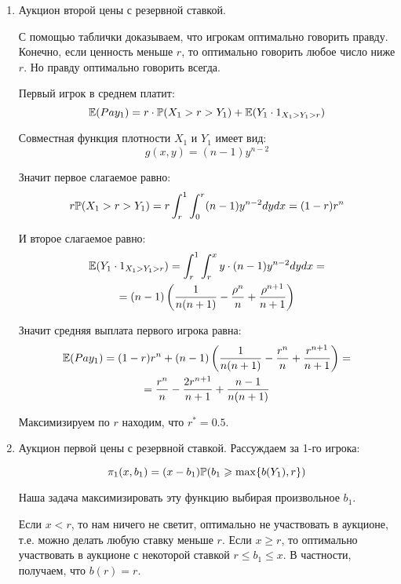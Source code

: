 \begin{enumerate}
\item Аукцион второй цены с резервной ставкой. 

С помощью таблички доказываем, что игрокам оптимально говорить правду. Конечно, если ценность меньше $ r $, то оптимально говорить любое число ниже $ r $. Но правду оптимально говорить всегда. 

Первый игрок в среднем платит:
\begin{equation}
\E(Pay_{1})=r\cdot \P(X_{1}>r>Y_{1})+\E(Y_{1}\cdot 1_{X_{1}>Y_{1}>r})
\end{equation}

Совместная функция плотности $ X_{1} $ и $ Y_{1} $ имеет вид:
\begin{equation}
g(x,y)=(n-1)y^{n-2}
\end{equation}

Значит первое слагаемое равно:
\begin{equation}
r\P(X_{1}>r>Y_{1})=r\int_{r}^{1}\int_{0}^{r} (n-1)y^{n-2} dy dx=(1-r)r^{n}
\end{equation}

И второе слагаемое равно:
\begin{multline} \label{E_Y_1XYr}
\E(Y_{1}\cdot 1_{X_{1}>Y_{1}>r})=\int_{r}^{1}\int_{r}^{x} y\cdot (n-1)y^{n-2} dy dx=\\
=(n-1)\left(\frac{1}{n(n+1)}-\frac{\rho^{n}}{n}+\frac{\rho^{n+1}}{n+1}\right)
\end{multline}

Значит средняя выплата первого игрока равна:
\begin{multline}
\E(Pay_{1})=(1-r)r^{n}+(n-1)\left(\frac{1}{n(n+1)}-\frac{r^{n}}{n}+\frac{r^{n+1}}{n+1}\right)=\\
=\frac{r^{n}}{n}-\frac{2r^{n+1}}{n+1}+\frac{n-1}{n(n+1)}
\end{multline}

Максимизируем по $ r $ находим, что $ r^{*}=0.5 $.


\item Аукцион первой цены с резервной ставкой. Рассуждаем за 1-го игрока: 

\begin{equation}
\pi_{1}(x,b_{1})=(x-b_{1})\P(b_{1}\geq \max\{b(Y_{1}),r\})
\end{equation}

Наша задача максимизировать эту функцию выбирая произвольное $ b_{1} $.

Если $ x<r $, то нам ничего не светит, оптимально не участвовать в аукционе, т.е. можно делать любую ставку меньше $ r $. Если $ x\geq r $, то оптимально участвовать в аукционе с некоторой ставкой $ r\leq b_{1}\leq x $. В частности, получаем, что $ b(r)=r$.



\end{enumerate}
